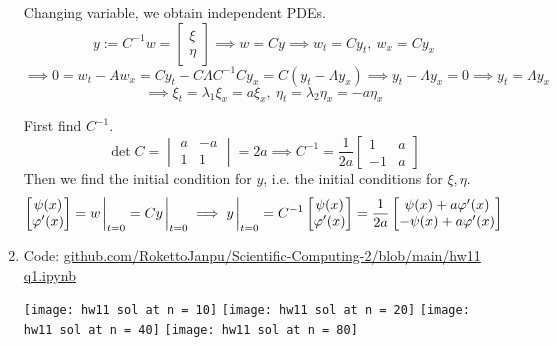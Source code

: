 \documentclass{article}
\newcommand{\m}[2][b]{\begin{#1matrix}#2\end{#1matrix}}
\newcommand{\vp}{\varphi}
\newcommand{\inv}{^{-1}}
\newcommand{\imp}{\implies}
\begin{document}
\begin{enumerate}[label=(\alph*)]
Changing variable, we obtain independent PDEs.
$$y := C\inv w = \m{\xi \\ \eta}
\imp w = Cy
\imp w_t = Cy_t,
~w_x = Cy_x$$
$$\imp 0 = w_t - Aw_x
= Cy_t - C\Lambda C\inv Cy_x
= C(y_t-\Lambda y_x)
\imp y_t - \Lambda y_x = 0
\imp y_t = \Lambda y_x$$
$$\imp \xi_t = \lambda_1\xi_x = a\xi_x,
~\eta_t = \lambda_2\eta_x = -a\eta_x$$

First find $C\inv$.
$$\det C = \m[v]{a & -a \\ 1 & 1}
= 2a
\imp C\inv = \frac{1}{2a}\m{1 & a \\ -1 & a}$$
Then we find the initial condition for $y$, i.e. the initial conditions for $\xi,\eta$.
$$\m{\psi(x) \\ \vp'(x)} = w\eval_{t=0} = Cy\eval_{t=0}
\imp y\eval_{t=0} = C\inv\m{\psi(x) \\ \vp'(x)}
= \frac{1}{2a}\m{\psi(x)+a\vp'(x) \\ -\psi(x)+a\vp'(x)}$$


\item Code: \url{github.com/RokettoJanpu/Scientific-Computing-2/blob/main/hw11 q1.ipynb}

\begin{center}
	\texttt{[image: hw11 sol at n = 10]}
	\texttt{[image: hw11 sol at n = 20]}
	\texttt{[image: hw11 sol at n = 40]}
	\texttt{[image: hw11 sol at n = 80]}
\end{center}
	
\end{enumerate}


	
\end{document}
